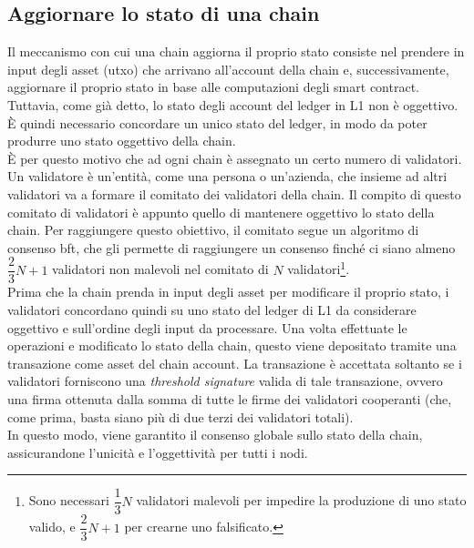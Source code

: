 \documentclass[12pt,a4paper,openright,twoside]{report}
\begin{document}
\subsection{Aggiornare lo stato di una chain}
Il meccanismo con cui una chain aggiorna il proprio stato consiste nel prendere in input degli asset (\acrshort{utxo}) che arrivano all'account della chain e, successivamente, aggiornare il proprio stato in base alle computazioni degli smart contract. Tuttavia, come già detto, lo stato degli account del ledger in L1 non è oggettivo. È quindi necessario concordare un unico stato del ledger, in modo da poter produrre uno stato oggettivo della chain.\\
È per questo motivo che ad ogni chain è assegnato un certo numero di validatori. Un validatore è un'entità, come una persona o un'azienda, che insieme ad altri validatori va a formare il comitato dei validatori della chain. Il compito di questo comitato di validatori è appunto quello di mantenere oggettivo lo stato della chain. Per raggiungere questo obiettivo, il comitato segue un algoritmo di consenso \acrfull{bft}, che gli permette di raggiungere un consenso finché ci siano almeno \(\dfrac{2}{3}N+1\) validatori non malevoli nel comitato di \(N\) validatori\footnote{Sono necessari \(\dfrac{1}{3}N\) validatori malevoli per impedire la produzione di uno stato valido, e \(\dfrac{2}{3}N+1\) per crearne uno falsificato.}.\\
Prima che la chain prenda in input degli asset per modificare il proprio stato, i validatori concordano quindi su uno stato del ledger di L1 da considerare oggettivo e sull'ordine degli input da processare. Una volta effettuate le operazioni e modificato lo stato della chain, questo viene depositato tramite una transazione come asset del chain account. La transazione è accettata soltanto se i validatori forniscono una \textit{threshold signature} valida di tale transazione, ovvero una firma ottenuta dalla somma di tutte le firme dei validatori cooperanti (che, come prima, basta siano più di due terzi dei validatori totali).\\
In questo modo, viene garantito il consenso globale sullo stato della chain, assicurandone l'unicità e l'oggettività per tutti i nodi.
\end{document}
